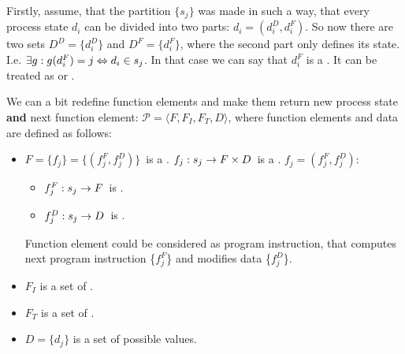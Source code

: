 Firstly, assume, that the partition $\{s_j\}$ was made in such a way,
that every process state $d_i$ can be divided into two parts:
$d_i = (d^D_i, d^F_i)$.
So now there are two sets $D^D = \{d^D_i\}$ and $D^F = \{d^F_i\}$,
where the second part only defines its state.
I.e. $\exists g: g(d^F_i) = j \Leftrightarrow d_i \in s_j$.
In that case we can say that $d^F_i$ is a .
It can be treated as  or .





We can a bit redefine function elements and make them return
new process state \textbf{and}
next function element: $\mathcal{P} = \langle F, F_I, F_T, D \rangle$,
where function elements and data are defined as follows:
\begin{itemize}
    \item $F = \{f_j\} = \{(f^F_j, f^D_j)\}$~is a .
        $f_j: s_j \rightarrow F \times D$~is a .
        $f_j = (f^F_j, f^D_j)$:
        \begin{itemize}
            \item $f^F_j: s_j \rightarrow F$~is
                .
            \item $f^D_j: s_j \rightarrow D$~is .
        \end{itemize}
        Function element could be considered as program instruction, that
        computes next program instruction \{$f^F_j$\}
        and modifies data \{$f^D_j$\}.
    \item $F_I$ is a set of .
    \item $F_T$ is a set of .
    \item $D = \{d_j\}$ is a set of possible  values.
\end{itemize}

